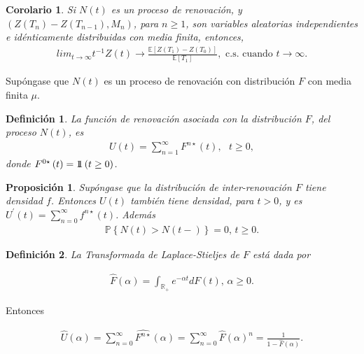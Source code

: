 \documentclass{article}
\newtheorem{Def}{Definición}
\newtheorem{Prop}{Proposición}
\newtheorem{Coro}{Corolario}
\newcommand{\rea}{\mathbb{R}}
\newcommand{\esp}{\mathbb{E}}
\newcommand{\prob}{\mathbb{P}}
\newcommand{\indora}{\mbox{$1$\hspace{-0.8ex}$1$}}
\begin{document}
\begin{Coro}
Si $N\left(t\right)$ es un proceso de renovaci\'on, y $\left(Z\left(T_{n}\right)-Z\left(T_{n-1}\right),M_{n}\right)$, para $n\geq1$, son variables aleatorias independientes e id\'enticamente distribuidas con media finita, entonces,
\begin{eqnarray}
lim_{t\rightarrow\infty}t^{-1}Z\left(t\right)\rightarrow\frac{\esp\left[Z\left(T_{1}\right)-Z\left(T_{0}\right)\right]}{\esp\left[T_{1}\right]},\textrm{ c.s. cuando  }t\rightarrow\infty.
\end{eqnarray}
\end{Coro}


Sup\'ongase que $N\left(t\right)$ es un proceso de renovaci\'on con distribuci\'on $F$ con media finita $\mu$.

\begin{Def}
La funci\'on de renovaci\'on asociada con la distribuci\'on $F$, del proceso $N\left(t\right)$, es
\begin{eqnarray*}
U\left(t\right)=\sum_{n=1}^{\infty}F^{n\star}\left(t\right),\textrm{   }t\geq0,
\end{eqnarray*}
donde $F^{0\star}\left(t\right)=\indora\left(t\geq0\right)$.
\end{Def}


\begin{Prop}
Sup\'ongase que la distribuci\'on de inter-renovaci\'on $F$ tiene densidad $f$. Entonces $U\left(t\right)$ tambi\'en tiene densidad, para $t>0$, y es $U^{'}\left(t\right)=\sum_{n=0}^{\infty}f^{n\star}\left(t\right)$. Adem\'as
\begin{eqnarray*}
\prob\left\{N\left(t\right)>N\left(t-\right)\right\}=0\textrm{,   }t\geq0.
\end{eqnarray*}
\end{Prop}

\begin{Def}
La Transformada de Laplace-Stieljes de $F$ est\'a dada por

\begin{eqnarray*}
\hat{F}\left(\alpha\right)=\int_{\rea_{+}}e^{-\alpha t}dF\left(t\right)\textrm{,  }\alpha\geq0.
\end{eqnarray*}
\end{Def}

Entonces

\begin{eqnarray*}
\hat{U}\left(\alpha\right)=\sum_{n=0}^{\infty}\hat{F^{n\star}}\left(\alpha\right)=\sum_{n=0}^{\infty}\hat{F}\left(\alpha\right)^{n}=\frac{1}{1-\hat{F}\left(\alpha\right)}.
\end{eqnarray*}
\end{document}

